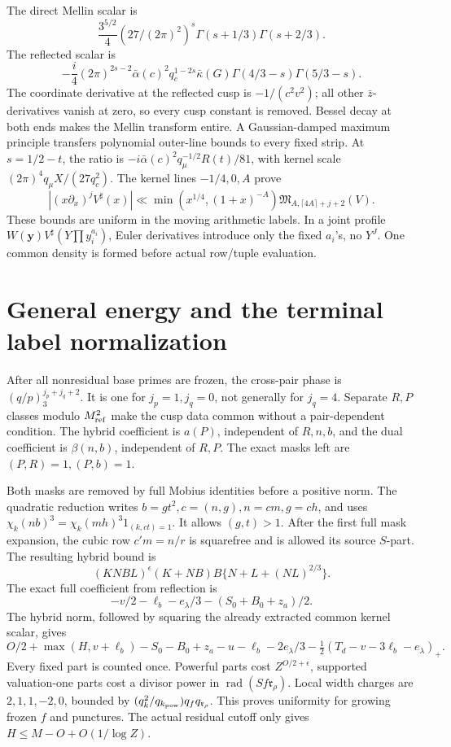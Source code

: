 \documentclass[12pt]{article}
\begin{document}
The direct Mellin scalar is
\[
 \frac{3^{5/2}}4(27/(2\pi)^2)^s
                      \Gamma(s+1/3)\Gamma(s+2/3).
\]
The reflected scalar is
\[
 -\frac i4(2\pi)^{2s-2}\bar\alpha(c)^2q_c^{1-2s}
 \bar\kappa(G)\Gamma(4/3-s)\Gamma(5/3-s).
\]
The coordinate derivative at the reflected cusp is
\(-1/(c^2v^2)\); all other \(\bar z\)-derivatives vanish at zero,
so every cusp constant is removed.
Bessel decay at both ends makes the Mellin transform entire.
A Gaussian-damped maximum principle transfers polynomial outer-line
bounds to every fixed strip.  At \(s=1/2-t\), the ratio is
\(-i\bar\alpha(c)^2q_\mu^{-1/2}R(t)/81\), with kernel scale
\((2\pi)^4q_\mu X/(27q_c^2)\).
The kernel lines \(-1/4,0,A\) prove
\[
 |(x\partial_x)^jV^\sharp(x)|
 \ll \min(x^{1/4},(1+x)^{-A})
                       \mathfrak M_{A,\lceil4A\rceil+j+2}(V).
\]
These bounds are uniform in the moving arithmetic labels.
In a joint profile \(W(\mathbf y)V^\sharp(Y\prod y_i^{a_i})\),
Euler derivatives introduce only the fixed \(a_i\)'s, no \(Y^J\).
One common density is formed before actual row/tuple evaluation.

\section{General energy and the terminal label normalization}

After all nonresidual base primes are frozen, the cross-pair phase is
\((q/p)_3^{j_p+j_q+2}\).
It is one for \(j_p=1,j_q=0\), not generally for \(j_q=4\).
Separate \(R,P\) classes modulo \(M_{\rm ref}^2\) make the
cusp data common without a pair-dependent condition.
The hybrid coefficient is \(a(P)\), independent of \(R,n,b\),
and the dual coefficient is \(\beta(n,b)\), independent of \(R,P\).
The exact masks left are \((P,R)=1,(P,b)=1\).

Both masks are removed by full Mobius identities before a positive
norm.  The quadratic reduction writes \(b=gt^2,c=(n,g),n=cm,g=ch\),
and uses
\(\chi_k(nb)^3=\chi_k(mh)^3 1_{(k,ct)=1}\).
It allows \((g,t)>1\).  After the first full mask expansion, the
cubic row \(c'm=n/r\) is squarefree and is allowed its source \(S\)-part.
The resulting hybrid bound is
\[
 (KNBL)^\epsilon(K+NB)B\{N+L+(NL)^{2/3}\}.
\]
The exact full coefficient from reflection is
\[
 -v/2-\ell_b-e_\lambda/3-(S_0+B_0+z_a)/2.
\]
The hybrid norm, followed by squaring the already extracted common
kernel scalar, gives
\[
 O/2+\max(H,v+\ell_b)-S_0-B_0+z_a-u-\ell_b-2e_\lambda/3
 -\tfrac12(T_d-v-3\ell_b-e_\lambda)_+.
\]
Every fixed part is counted once.  Powerful parts cost \(Z^{O/2+\epsilon}\),
supported valuation-one parts cost a divisor power in
\(\operatorname{rad}(Sf\mathfrak r_\rho)\).
Local width charges are \(2,1,1,-2,0\), bounded by
\((q_k^2/q_{k_{\rm pow}})q_fq_{\mathfrak r_\rho}\).
This proves uniformity for growing frozen \(f\) and punctures.
The actual residual cutoff only gives \(H\le M-O+O(1/\log Z)\).
\end{document}
